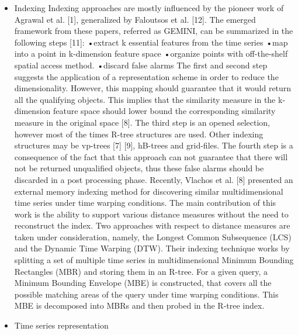 \documentclass[12pt]{report}
\begin{document}
\begin{itemize}

\item{Indexing }
Indexing approaches are mostly influenced by the pioneer work of Agrawal et al. [1], generalized by Faloutsos et al. [12]. The emerged framework from these papers, referred as GEMINI, can be summarized in the following steps [11]:
•extract k essential features from the time series 
•map into a point in k-dimension feature space
•organize points with off-the-shelf spatial access method.
•discard false alarms
The first and second step suggests the application of a representation scheme in order to reduce the dimensionality. However, this mapping should guarantee that it would return all the qualifying objects. This implies that the similarity measure in the k-dimension feature space should lower bound the corresponding similarity measure in the original space [8]. The third step is an opened selection, however most of the times R-tree structures are used. Other indexing structures may be vp-trees [7] [9], hB-trees and grid-files. The fourth step is a consequence of the fact that this approach can not guarantee that there will not be returned unqualified objects, thus these false alarms should be discarded in a post processing phase.
Recently, Vlachos et al. [8] presented an external memory indexing method for discovering similar multidimensional time series under time warping conditions. The main contribution of this work is the ability to support various distance measures without the need to reconstruct the index. Two approaches with respect to distance measures are taken under consideration, namely, the Longest Common Subsequence (LCS) and the Dynamic Time Warping (DTW). Their indexing technique works by splitting a set of multiple time series in multidimensional Minimum Bounding Rectangles (MBR) and storing them in an R-tree. For a given query, a Minimum Bounding Envelope (MBE) is constructed, that covers all the possible matching areas of the query under time warping conditions. This MBE is decomposed into MBRs and then probed in the R-tree index.
\item{Time series representation}

\end{itemize}
\end{document}
